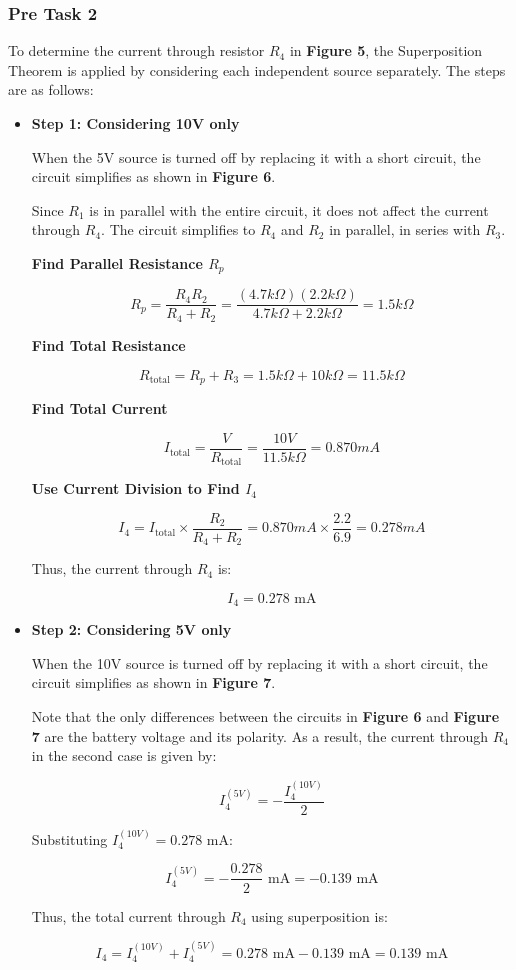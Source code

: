 \documentclass{article}
\begin{document}
\newpage

\subsubsection{Pre Task 2}


To determine the current through resistor \( R_4 \) in \textbf{Figure 5}, the Superposition Theorem is applied by considering each independent source separately. The steps are as follows:
\begin{itemize}
  \item \textbf{Step 1: Considering 10V only}
  
  When the 5V source is turned off by replacing it with a short circuit, the circuit simplifies as shown in \textbf{Figure 6}.

  Since \( R_1 \) is in parallel with the entire circuit, it does not affect the current through \( R_4 \). The circuit simplifies to \( R_4 \) and \( R_2 \) in parallel, in series with \( R_3 \).

\textbf{Find Parallel Resistance \( R_p \)}

\[
R_p = \frac{R_4 R_2}{R_4 + R_2} = \frac{(4.7k\Omega)(2.2k\Omega)}{4.7k\Omega + 2.2k\Omega} = 1.5k\Omega
\]

\textbf{Find Total Resistance}

\[
R_{\text{total}} = R_p + R_3 = 1.5k\Omega + 10k\Omega = 11.5k\Omega
\]

\textbf{Find Total Current}

\[
I_{\text{total}} = \frac{V}{R_{\text{total}}} = \frac{10V}{11.5k\Omega} = 0.870mA
\]

\textbf{Use Current Division to Find \( I_4 \)}

\[
I_4 = I_{\text{total}} \times \frac{R_2}{R_4 + R_2} = 0.870mA \times \frac{2.2}{6.9} = 0.278mA
\]

Thus, the current through \( R_4 \) is:

\[
I_4 = 0.278 \text{ mA}
\]

\item \textbf{Step 2: Considering 5V only}

When the 10V source is turned off by replacing it with a short circuit, the circuit simplifies as shown in \textbf{Figure 7}.

Note that the only differences between the circuits in \textbf{Figure 6} and \textbf{Figure 7} are the battery voltage and its polarity. As a result, the current through \( R_4 \) in the second case is given by:

\[
I_4^{(5V)} = -\frac{I_4^{(10V)}}{2}
\]

Substituting \( I_4^{(10V)} = 0.278 \text{ mA} \):

\[
I_4^{(5V)} = -\frac{0.278}{2} \text{ mA} = -0.139 \text{ mA}
\]

Thus, the total current through \( R_4 \) using superposition is:

\[
I_4 = I_4^{(10V)} + I_4^{(5V)} = 0.278 \text{ mA} - 0.139 \text{ mA} = 0.139 \text{ mA}
\]
\end{itemize}
\end{document}
